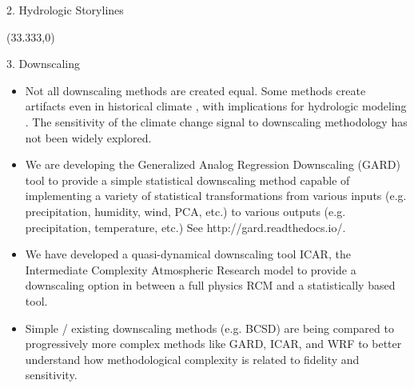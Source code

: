 \documentclass{beamer}
\begin{document}
\begin{frame}{}
\begin{columns}
\begin{column}{.3333\paperwidth}
\begin{textblock}{\textwidth \TPHorizModule}
\begin{block}{2. Hydrologic Storylines}
    \end{block}
   \end{textblock}



   \begin{textblock}{\textwidth \TPHorizModule}(33.333,0)
    \begin{block}{3. Downscaling}


     \begin{itemize}
      \justifying

      \item Not all downscaling methods are created equal. Some methods create artifacts even in historical climate \citep{Gutmann_2014}, with implications for hydrologic modeling \citep{Mizukami_2016}. The sensitivity of the climate change signal to downscaling methodology has not been widely explored.
      \item We are developing the Generalized Analog Regression Downscaling (GARD) tool to provide a simple statistical downscaling method capable of implementing a variety of statistical transformations from various inputs (e.g. precipitation, humidity, wind, PCA, etc.) to various outputs (e.g. precipitation, temperature, etc.) See http://gard.readthedocs.io/.
      \item We have developed a quasi-dynamical downscaling tool ICAR, the Intermediate Complexity Atmospheric Research model \citep{Gutmann_2016} to provide a downscaling option in between a full physics RCM and a statistically based tool.
      \item Simple / existing downscaling methods (e.g. BCSD) are being compared to progressively more complex methods like GARD, ICAR, and WRF to better understand how methodological complexity is related to fidelity and sensitivity.


\end{itemize}
\end{block}
\end{textblock}
\end{column}
\end{columns}
\end{frame}
\end{document}
